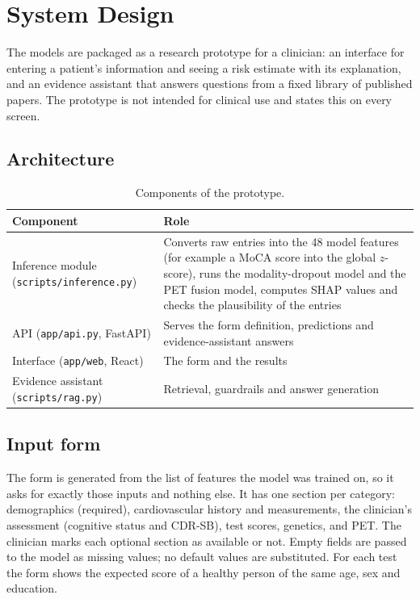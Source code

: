 \chapter{System Design}
\label{ch:system}

The models are packaged as a research prototype for a clinician: an interface for entering a patient's information and seeing a risk estimate with its explanation, and an evidence assistant that answers questions from a fixed library of published papers. The prototype is not intended for clinical use and states this on every screen.

\section{Architecture}

\begin{table}[H]
\centering\small
\caption{Components of the prototype.}
\label{tab:components}
\begin{tabularx}{\textwidth}{@{}lY@{}}
\toprule
Component & Role \\
\midrule
Inference module (\texttt{scripts/inference.py}) & Converts raw entries into the 48 model features (for example a MoCA score into the global $z$-score), runs the modality-dropout model and the PET fusion model, computes SHAP values and checks the plausibility of the entries \\
API (\texttt{app/api.py}, FastAPI) & Serves the form definition, predictions and evidence-assistant answers \\
Interface (\texttt{app/web}, React) & The form and the results \\
Evidence assistant (\texttt{scripts/rag.py}) & Retrieval, guardrails and answer generation \\
\bottomrule
\end{tabularx}
\end{table}

\section{Input form}

The form is generated from the list of features the model was trained on, so it asks for exactly those inputs and nothing else. It has one section per category: demographics (required), cardiovascular history and measurements, the clinician's assessment (cognitive status and CDR-SB), test scores, genetics, and PET. The clinician marks each optional section as available or not. Empty fields are passed to the model as missing values; no default values are substituted. For each test the form shows the expected score of a healthy person of the same age, sex and education.

